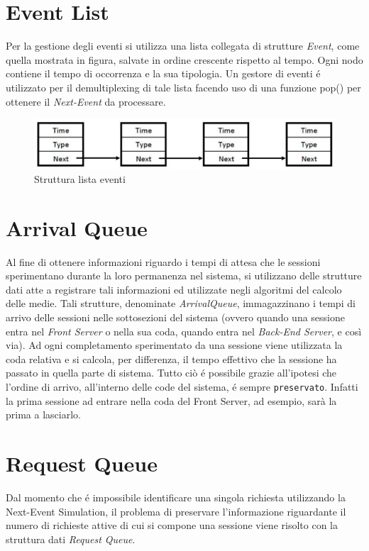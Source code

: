 \section{Event List}
Per la gestione degli eventi si utilizza una lista collegata di strutture 
\textit{Event}, come quella mostrata in figura, salvate in ordine crescente 
rispetto al tempo. Ogni nodo contiene il tempo di occorrenza e la sua tipologia. 
Un gestore di eventi \'e utilizzato per il demultiplexing di tale lista facendo 
uso di una funzione pop() per ottenere il \textit{Next-Event} da processare.
\begin{figure}[H]
  \centering
  \includegraphics[scale=0.5]{img/EventList.png}
  \caption[EventList]{Struttura lista eventi}
  \label{fig:eventList}
\end{figure}

\section{Arrival Queue}
Al fine di ottenere informazioni riguardo i tempi di attesa che le sessioni 
sperimentano durante la loro permanenza nel sistema, si utilizzano delle 
strutture dati atte a registrare tali informazioni ed utilizzate negli algoritmi 
del calcolo delle medie. Tali strutture, denominate \textit{ArrivalQueue}, 
immagazzinano i tempi di arrivo delle sessioni nelle sottosezioni del sistema 
(ovvero quando una sessione entra nel \textit{Front Server} o nella sua coda, 
quando entra nel \textit{Back-End Server}, e cos\`i via). Ad ogni completamento 
sperimentato da una sessione viene utilizzata la coda relativa e si calcola, per 
differenza, il tempo effettivo che la sessione ha passato in quella parte di 
sistema. Tutto ci\`o \'e possibile grazie all'ipotesi che l'ordine di arrivo, 
all'interno delle code del sistema, \'e sempre \texttt{preservato}. Infatti la 
prima sessione ad entrare nella coda del Front Server, ad esempio, sar\`a la 
prima a lasciarlo.

\section{Request Queue}
Dal momento che \'e impossibile identificare una singola richiesta utilizzando 
la Next-Event Simulation, il problema di preservare l'informazione riguardante 
il numero di richieste attive di cui si compone una sessione viene risolto con 
la struttura dati \textit{Request Queue}. 

